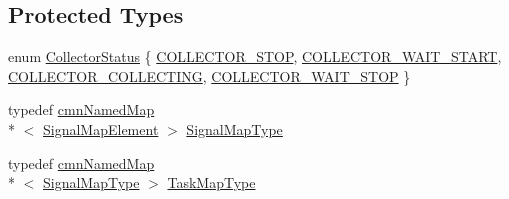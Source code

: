 \subsection*{Protected Types}
\begin{DoxyCompactItemize}
\item 
enum \hyperlink{classmts_collector_base_adfbc058665584a56933a7997229c1fb6}{Collector\-Status} \{ \hyperlink{classmts_collector_base_adfbc058665584a56933a7997229c1fb6a2bf9d2e7c0bcf5aa734411dd6c969ff2}{C\-O\-L\-L\-E\-C\-T\-O\-R\-\_\-\-S\-T\-O\-P}, 
\hyperlink{classmts_collector_base_adfbc058665584a56933a7997229c1fb6a67657229ff967c447ed3289c730bdf11}{C\-O\-L\-L\-E\-C\-T\-O\-R\-\_\-\-W\-A\-I\-T\-\_\-\-S\-T\-A\-R\-T}, 
\hyperlink{classmts_collector_base_adfbc058665584a56933a7997229c1fb6a9162148874993d7a2bf7a40bd5b1ad24}{C\-O\-L\-L\-E\-C\-T\-O\-R\-\_\-\-C\-O\-L\-L\-E\-C\-T\-I\-N\-G}, 
\hyperlink{classmts_collector_base_adfbc058665584a56933a7997229c1fb6a84e8e4233359e044e0f7db8ddc04f8c5}{C\-O\-L\-L\-E\-C\-T\-O\-R\-\_\-\-W\-A\-I\-T\-\_\-\-S\-T\-O\-P}
 \}
\item 
typedef \hyperlink{classcmn_named_map}{cmn\-Named\-Map}\\*
$<$ \hyperlink{classmts_collector_base_1_1_signal_map_element}{Signal\-Map\-Element} $>$ \hyperlink{classmts_collector_base_ad4d928af971d864065a9a6d9650a4050}{Signal\-Map\-Type}
\item 
typedef \hyperlink{classcmn_named_map}{cmn\-Named\-Map}\\*
$<$ \hyperlink{classmts_collector_base_ad4d928af971d864065a9a6d9650a4050}{Signal\-Map\-Type} $>$ \hyperlink{classmts_collector_base_a6b47b3df8797f600ac9791640561f035}{Task\-Map\-Type}
\end{DoxyCompactItemize}
